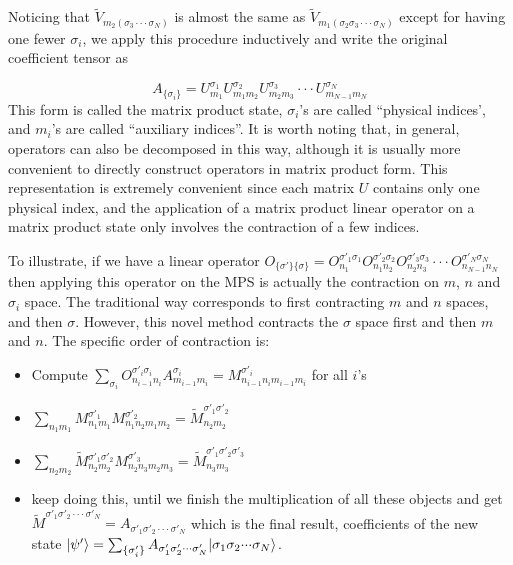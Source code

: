 \documentclass[english]{article}
\begin{document}
Noticing that $\tilde{V}_{m_{2}(\sigma_{3}\cdot\cdot\cdot\sigma_{N})}$
is almost the same as $\tilde{V}_{m_{1}(\sigma_{2}\sigma_{3}\cdot\cdot\cdot\sigma_{N})}$
except for having one fewer $\sigma_{i}$, we apply this procedure
inductively and write the original coefficient tensor as

\[
A_{\{\sigma_{i}\}}=U_{m_{1}}^{\sigma_{1}}U_{m_{1}m_{2}}^{\sigma_{2}}U_{m_{2}m_{3}}^{\sigma_{3}}\cdot\cdot\cdot U_{m_{N-1}m_{N}}^{\sigma_{N}}
\]
This form is called the matrix product state, $\sigma_{i}$'s
are called ``physical indices', and $m_{i}$'s are called ``auxiliary
indices''. It is worth noting that, in general, operators can also
be decomposed in this way, although it is usually more convenient
to directly construct operators in matrix product form. This representation
is extremely convenient since each matrix $U$ contains only one physical
index, and the application of a matrix product linear operator
on a matrix product state only involves the contraction of a few indices.

To illustrate, if we have a linear operator $O_{\{\sigma'\}\{\sigma\}}=O_{n_{1}}^{\sigma'_{1}\sigma_{1}}O_{n_{1}n_{2}}^{\sigma'_{2}\sigma_{2}}O_{n_{2}n_{3}}^{\sigma'_{3}\sigma_{3}}\cdot\cdot\cdot O_{n_{N-1}n_{N}}^{\sigma'_{N}\sigma_{N}}$
then applying this operator on the MPS is actually the contraction
on $m$, $n$ and $\sigma_{i}$ space. The traditional way corresponds
to first contracting $m$ and $n$ spaces, and then $\sigma$. However, this
novel method contracts the $\sigma$ space first and then $m$ and
$n$. The specific order of contraction is:
\begin{itemize}
\item Compute $\sum_{\sigma_{i}}O_{n_{i-1}n_{i}}^{\sigma'_{i}\sigma_{i}}A_{m_{i-1}m_{i}}^{\sigma_{i}}=M_{n_{i-1}n_{i}m_{i-1}m_{i}}^{\sigma'_{i}}$
for all $i$'s
\item $\sum_{n_{1}m_{1}}M_{n_{1}m_{1}}^{\sigma'_{1}}M_{n_{1}n_{2}m_{1}m_{2}}^{\sigma'_{2}}=\tilde{M}_{n_{2}m_{2}}^{\sigma'_{1}\sigma'_{2}}$
\item $\sum_{n_{2}m_{2}}\tilde{M}{}_{n_{2}m_{2}}^{\sigma'_{1}\sigma'_{2}}M_{n_{2}n_{3}m_{2}m_{3}}^{\sigma'_{3}}=\tilde{M}_{n_{3}m_{3}}^{\sigma'_{1}\sigma'_{2}\sigma'_{3}}$
\item keep doing this, until we finish the multiplication of all these objects
and get $\tilde{M}^{\sigma'_{1}\sigma'_{2}\cdot\cdot\cdot\sigma'_{N}}=A_{\sigma'_{1}\sigma'_{2}\cdot\cdot\cdot\sigma'_{N}}$
which is the final result, coefficients of the new state $|\psi'\rangle=\sum_{\{\sigma'_{i}\}}A_{\sigma'_{1}\sigma'_{2}\cdot\cdot\cdot\sigma'_{N}}|\sigma_{1}\sigma_{2}\text{\ensuremath{\cdot}}\text{\ensuremath{\cdot}}\text{\ensuremath{\cdot}}\sigma_{N}\rangle$.
\end{itemize}
\end{document}
